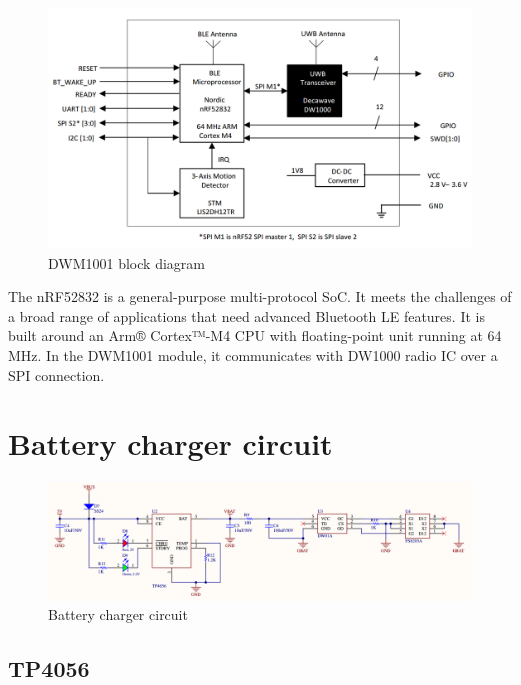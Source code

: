\documentclass[\main/main.tex]{subfiles}
\begin{document}
\begin{figure}[H]
    \begin{center}
        \includegraphics[scale=0.35]{dwm1001_block_diagram.png}
    \end{center}
    \caption{DWM1001 block diagram}
    \label{fig:dwm1001_block_diagram}
\end{figure}

The nRF52832 is a general-purpose multi-protocol SoC. It meets the challenges of a broad range of applications that need advanced Bluetooth LE features. It is built around an Arm® Cortex™-M4 CPU with floating-point unit running at 64 MHz. In the DWM1001 module, it communicates with DW1000 radio IC over a SPI connection.

\section{Battery charger circuit}

\begin{figure}[H]
    \begin{center}
        \includegraphics[scale=0.35]{battery_charger_circuit.png}
    \end{center}
    \caption{Battery charger circuit}
    \label{fig:battery_charger_circuit}
\end{figure}

\subsection{TP4056}
\end{document}
